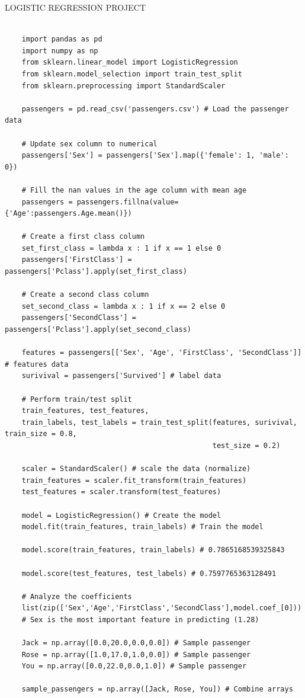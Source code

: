 \documentclass[11pt, a4paper]{article}
\begin{document}
\begin{spacing}{1.1}
	\noindent LOGISTIC REGRESSION PROJECT
	\begin{lstlisting}
	
	import pandas as pd
	import numpy as np
	from sklearn.linear_model import LogisticRegression
	from sklearn.model_selection import train_test_split
	from sklearn.preprocessing import StandardScaler
	
	passengers = pd.read_csv('passengers.csv') # Load the passenger data
	
	# Update sex column to numerical
	passengers['Sex'] = passengers['Sex'].map({'female': 1, 'male': 0}) 
	
	# Fill the nan values in the age column with mean age
	passengers = passengers.fillna(value={'Age':passengers.Age.mean()})
	
	# Create a first class column
	set_first_class = lambda x : 1 if x == 1 else 0
	passengers['FirstClass'] = passengers['Pclass'].apply(set_first_class)
	
	# Create a second class column
	set_second_class = lambda x : 1 if x == 2 else 0
	passengers['SecondClass'] = passengers['Pclass'].apply(set_second_class)
	
	features = passengers[['Sex', 'Age', 'FirstClass', 'SecondClass']] # features data
	surivival = passengers['Survived'] # label data
	
	# Perform train/test split
	train_features, test_features, 
	train_labels, test_labels = train_test_split(features, surivival, train_size = 0.8, 
	                                             test_size = 0.2)
	
	scaler = StandardScaler() # scale the data (normalize)
	train_features = scaler.fit_transform(train_features)
	test_features = scaler.transform(test_features)
	
	model = LogisticRegression() # Create the model
	model.fit(train_features, train_labels) # Train the model
	
	model.score(train_features, train_labels) # 0.7865168539325843
	
	model.score(test_features, test_labels) # 0.7597765363128491
	
	# Analyze the coefficients
	list(zip(['Sex','Age','FirstClass','SecondClass'],model.coef_[0]))
	# Sex is the most important feature in predicting (1.28)
	
	Jack = np.array([0.0,20.0,0.0,0.0]) # Sample passenger
	Rose = np.array([1.0,17.0,1.0,0.0]) # Sample passenger
	You = np.array([0.0,22.0,0.0,1.0]) # Sample passenger
	
	sample_passengers = np.array([Jack, Rose, You]) # Combine arrays
	

\end{lstlisting}
\end{spacing}
\end{document}
